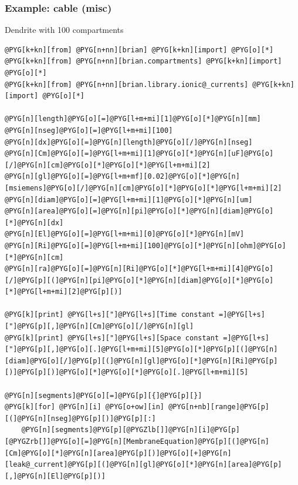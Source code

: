 \documentclass[letterpaper,10pt,english]{manual}
\begin{document}
\resetcurrentobjects
\hypertarget{--doc-examples-misc_cable}{}

\hypertarget{index-40}{}\subsubsection{Example: cable (misc)}

Dendrite with 100 compartments

\begin{Verbatim}[commandchars=@\[\]]
@PYG[k+kn][from] @PYG[n+nn][brian] @PYG[k+kn][import] @PYG[o][*]
@PYG[k+kn][from] @PYG[n+nn][brian.compartments] @PYG[k+kn][import] @PYG[o][*]
@PYG[k+kn][from] @PYG[n+nn][brian.library.ionic@_currents] @PYG[k+kn][import] @PYG[o][*]

@PYG[n][length]@PYG[o][=]@PYG[l+m+mi][1]@PYG[o][*]@PYG[n][mm]
@PYG[n][nseg]@PYG[o][=]@PYG[l+m+mi][100]
@PYG[n][dx]@PYG[o][=]@PYG[n][length]@PYG[o][/]@PYG[n][nseg]
@PYG[n][Cm]@PYG[o][=]@PYG[l+m+mi][1]@PYG[o][*]@PYG[n][uF]@PYG[o][/]@PYG[n][cm]@PYG[o][*]@PYG[o][*]@PYG[l+m+mi][2]
@PYG[n][gl]@PYG[o][=]@PYG[l+m+mf][0.02]@PYG[o][*]@PYG[n][msiemens]@PYG[o][/]@PYG[n][cm]@PYG[o][*]@PYG[o][*]@PYG[l+m+mi][2]
@PYG[n][diam]@PYG[o][=]@PYG[l+m+mi][1]@PYG[o][*]@PYG[n][um]
@PYG[n][area]@PYG[o][=]@PYG[n][pi]@PYG[o][*]@PYG[n][diam]@PYG[o][*]@PYG[n][dx]
@PYG[n][El]@PYG[o][=]@PYG[l+m+mi][0]@PYG[o][*]@PYG[n][mV]
@PYG[n][Ri]@PYG[o][=]@PYG[l+m+mi][100]@PYG[o][*]@PYG[n][ohm]@PYG[o][*]@PYG[n][cm]
@PYG[n][ra]@PYG[o][=]@PYG[n][Ri]@PYG[o][*]@PYG[l+m+mi][4]@PYG[o][/]@PYG[p][(]@PYG[n][pi]@PYG[o][*]@PYG[n][diam]@PYG[o][*]@PYG[o][*]@PYG[l+m+mi][2]@PYG[p][)]

@PYG[k][print] @PYG[l+s]["]@PYG[l+s][Time constant =]@PYG[l+s]["]@PYG[p][,]@PYG[n][Cm]@PYG[o][/]@PYG[n][gl]
@PYG[k][print] @PYG[l+s]["]@PYG[l+s][Space constant =]@PYG[l+s]["]@PYG[p][,]@PYG[o][.]@PYG[l+m+mi][5]@PYG[o][*]@PYG[p][(]@PYG[n][diam]@PYG[o][/]@PYG[p][(]@PYG[n][gl]@PYG[o][*]@PYG[n][Ri]@PYG[p][)]@PYG[p][)]@PYG[o][*]@PYG[o][*]@PYG[o][.]@PYG[l+m+mi][5]

@PYG[n][segments]@PYG[o][=]@PYG[p][{]@PYG[p][}]
@PYG[k][for] @PYG[n][i] @PYG[o+ow][in] @PYG[n+nb][range]@PYG[p][(]@PYG[n][nseg]@PYG[p][)]@PYG[p][:]
    @PYG[n][segments]@PYG[p][@PYGZlb[]]@PYG[n][i]@PYG[p][@PYGZrb[]]@PYG[o][=]@PYG[n][MembraneEquation]@PYG[p][(]@PYG[n][Cm]@PYG[o][*]@PYG[n][area]@PYG[p][)]@PYG[o][+]@PYG[n][leak@_current]@PYG[p][(]@PYG[n][gl]@PYG[o][*]@PYG[n][area]@PYG[p][,]@PYG[n][El]@PYG[p][)]


\end{Verbatim}
\end{document}
